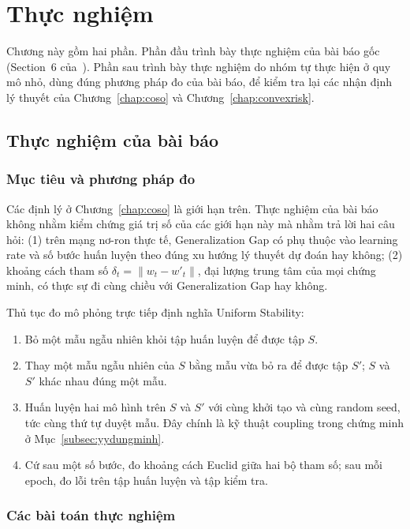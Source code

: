 \chapter{Thực nghiệm}
\label{chap:thucnghiem}

Chương này gồm hai phần. Phần đầu trình bày thực nghiệm của bài báo gốc (Section~6 của~\cite{hardt2016train}). Phần sau trình bày thực nghiệm do nhóm tự thực hiện ở quy mô nhỏ, dùng đúng phương pháp đo của bài báo, để kiểm tra lại các nhận định lý thuyết của Chương~\ref{chap:coso} và Chương~\ref{chap:convexrisk}.

\section{Thực nghiệm của bài báo}
\label{sec:thucnghiem-baibao}

\subsection{Mục tiêu và phương pháp đo}

Các định lý ở Chương~\ref{chap:coso} là giới hạn trên. Thực nghiệm của bài báo không nhằm kiểm chứng giá trị số của các giới hạn này mà nhằm trả lời hai câu hỏi: (1) trên mạng nơ-ron thực tế, Generalization Gap có phụ thuộc vào learning rate và số bước huấn luyện theo đúng xu hướng lý thuyết dự đoán hay không; (2) khoảng cách tham số $\delta_t = \|w_t - w'_t\|$, đại lượng trung tâm của mọi chứng minh, có thực sự đi cùng chiều với Generalization Gap hay không.

Thủ tục đo mô phỏng trực tiếp định nghĩa Uniform Stability:
\begin{enumerate}
    \item Bỏ một mẫu ngẫu nhiên khỏi tập huấn luyện để được tập $S$.
    \item Thay một mẫu ngẫu nhiên của $S$ bằng mẫu vừa bỏ ra để được tập $S'$; $S$ và $S'$ khác nhau đúng một mẫu.
    \item Huấn luyện hai mô hình trên $S$ và $S'$ với cùng khởi tạo và cùng random seed, tức cùng thứ tự duyệt mẫu. Đây chính là kỹ thuật coupling trong chứng minh ở Mục~\ref{subsec:yydungminh}.
    \item Cứ sau một số bước, đo khoảng cách Euclid giữa hai bộ tham số; sau mỗi epoch, đo lỗi trên tập huấn luyện và tập kiểm tra.
\end{enumerate}

\subsection{Các bài toán thực nghiệm}

